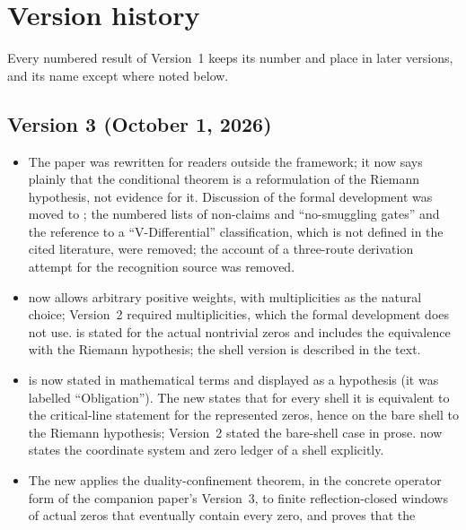 \section{Version history}
\label{app:version-history}
\begingroup\small

Every numbered result of Version~1 keeps its number and place in later
versions, and its name except where noted below.

\subsection*{Version 3 (October 1, 2026)}

\begin{itemize}
  \item The paper was rewritten for readers outside the framework; it
    now says plainly that the conditional theorem is a reformulation of
    the Riemann hypothesis, not evidence for it.  Discussion of the formal
    development was moved to ; the numbered
    lists of non-claims and ``no-smuggling gates'' and the reference to
    a ``V-Differential'' classification, which is not defined in the
    cited literature, were removed; the account of a three-route
    derivation attempt for the recognition source was removed.
  \item {} now allows arbitrary
    positive weights, with multiplicities as the natural choice;
    Version~2 required multiplicities, which the formal development does
    not use.   is stated for the actual
    nontrivial zeros and includes the equivalence with the Riemann
    hypothesis; the shell version is described in the text.
  \item {} is now stated in mathematical
    terms and displayed as a hypothesis (it was labelled
    ``Obligation'').  The new  states that for every shell it
    is equivalent to the critical-line statement for the represented
    zeros, hence on the bare shell to the Riemann hypothesis; Version~2
    stated the bare-shell case in prose.  
    now states the coordinate system and zero ledger of a shell
    explicitly.
  \item The new  applies the
    duality-confinement theorem, in the concrete operator form of the
    companion paper's Version~3, to finite reflection-closed windows of
    actual zeros that eventually contain every zero, and proves that the

\end{itemize}
